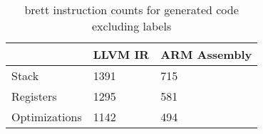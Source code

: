 \begin{table}[h!]
\centering
\begin{tabular}{p{}p{}p{}}
  \hline
 & LLVM IR & ARM Assembly \\ 
  \hline
Stack & 1391 & 715 \\ 
  Registers & 1295 & 581 \\ 
  Optimizations & 1142 & 494 \\ 
   \hline
\end{tabular}
\caption{brett instruction counts for generated code excluding labels}
\end{table}
